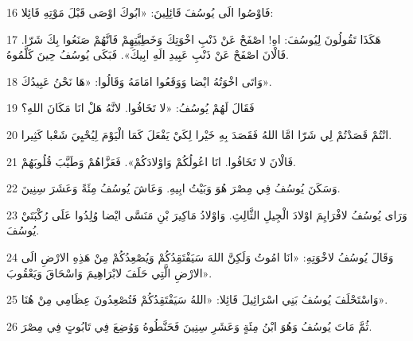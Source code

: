 \par 16 فَاوْصُوا الَى يُوسُفَ قَائِلِينَ: «ابُوكَ اوْصَى قَبْلَ مَوْتِهِ قَائِلا:
\par 17 هَكَذَا تَقُولُونَ لِيُوسُفَ: اهِ! اصْفَحْ عَنْ ذَنْبِ اخْوَتِكَ وَخَطِيَّتِهِمْ فَانَّهُمْ صَنَعُوا بِكَ شَرّا. فَالْانَ اصْفَحْ عَنْ ذَنْبِ عَبِيدِ الَهِ ابِيكَ». فَبَكَى يُوسُفُ حِينَ كَلَّمُوهُ.
\par 18 وَاتَى اخْوَتُهُ ايْضا وَوَقَعُوا امَامَهُ وَقَالُوا: «هَا نَحْنُ عَبِيدُكَ».
\par 19 فَقَالَ لَهُمْ يُوسُفُ: «لا تَخَافُوا. لانَّهُ هَلْ انَا مَكَانَ اللهِ؟
\par 20 انْتُمْ قَصَدْتُمْ لِي شَرّا امَّا اللهُ فَقَصَدَ بِهِ خَيْرا لِكَيْ يَفْعَلَ كَمَا الْيَوْمَ لِيُحْيِيَ شَعْبا كَثِيرا.
\par 21 فَالْانَ لا تَخَافُوا. انَا اعُولُكُمْ وَاوْلادَكُمْ». فَعَزَّاهُمْ وَطَيَّبَ قُلُوبَهُمْ.
\par 22 وَسَكَنَ يُوسُفُ فِي مِصْرَ هُوَ وَبَيْتُ ابِيهِ. وَعَاشَ يُوسُفُ مِئَةً وَعَشَرَ سِنِينَ.
\par 23 وَرَاى يُوسُفُ لافْرَايِمَ اوْلادَ الْجِيلِ الثَّالِثِ. وَاوْلادُ مَاكِيرَ بْنِ مَنَسَّى ايْضا وُلِدُوا عَلَى رُكْبَتَيْ يُوسُفَ.
\par 24 وَقَالَ يُوسُفُ لاخْوَتِهِ: «انَا امُوتُ وَلَكِنَّ اللهَ سَيَفْتَقِدُكُمْ وَيُصْعِدُكُمْ مِنْ هَذِهِ الارْضِ الَى الارْضِ الَّتِي حَلَفَ لابْرَاهِيمَ وَاسْحَاقَ وَيَعْقُوبَ».
\par 25 وَاسْتَحْلَفَ يُوسُفُ بَنِي اسْرَائِيلَ قَائِلا: «اللهُ سَيَفْتَقِدُكُمْ فَتُصْعِدُونَ عِظَامِي مِنْ هُنَا».
\par 26 ثُمَّ مَاتَ يُوسُفُ وَهُوَ ابْنُ مِئَةٍ وَعَشَرِ سِنِينَ فَحَنَّطُوهُ وَوُضِعَ فِي تَابُوتٍ فِي مِصْرَ.

